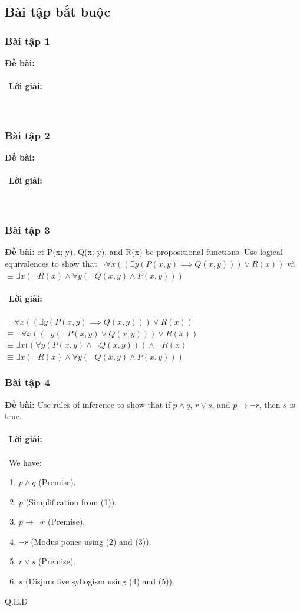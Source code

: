 \documentclass[a4paper]{article}
\begin{document}
\subsection{Bài tập bắt buộc}
\subsubsection{Bài tập 1}
\textbf{Đề bài:} 
\\\ \\\
\textbf{Lời giải:} \\\ \\\
\clearpage
\subsubsection{Bài tập 2}
\textbf{Đề bài:} 
\\\ \\\
\textbf{Lời giải:} \\\ \\\
\clearpage
\subsubsection{Bài tập 3}
\textbf{Đề bài:} et P(x; y), Q(x; y), and R(x) be propositional functions. Use logical equivalences to
show that $\lnot \forall x ((\exists y (P(x,y) \implies Q(x,y))) \lor R(x))$ và $\equiv \exists x (\lnot R(x) \land \forall y (\lnot Q(x,y) \land P(x,y)))$
\\\ \\\
\textbf{Lời giải:} \\\ \\\
$\lnot \forall x ((\exists y (P(x,y) \implies Q(x,y))) \lor R(x))$\\
	$\equiv \lnot \forall x ((\exists y (\lnot P(x,y) \lor Q(x,y))) \lor R(x))$\\
	$\equiv \exists x ((\forall y (P(x,y) \land \lnot Q(x,y))) \land \lnot R(x)$\\
	$\equiv \exists x (\lnot R(x) \land \forall y (\lnot Q(x,y) \land P(x,y)))$\\
\clearpage
\subsubsection{Bài tập 4}
\textbf{Đề bài:} Use rules of inference to show that if $p \land q$, $r \lor s$, and $p \rightarrow \lnot r$, then $s$ is true. \\\ \\\
\textbf{Lời giải:} \\\ \\\
We have:
\begin{enumerate}
\item $p \land q$ (Premise).
\item $p$ (Simplification from (1)).
\item $p \rightarrow \lnot r$ (Premise).
\item $\lnot r$ (Modus pones using (2) and (3)).
\item $r \lor s$ (Premise).
\item $s$ (Disjunctive syllogism using (4) and (5)).
\end{enumerate}
Q.E.D
\end{document}
